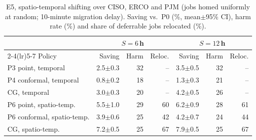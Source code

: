 \begin{table}[t]
\caption{E5, spatio-temporal shifting over CISO, ERCO and PJM (jobs homed uniformly at random; 10-minute
migration delay). Saving vs.\ P0 (\%, mean$\pm$95\% CI), harm rate (\%) and share of deferrable jobs relocated (\%).}
\label{tab:spatial}
\centering\scriptsize\setlength{\tabcolsep}{2.5pt}
\begin{tabular}{lrrrrrr}
\toprule
 & \multicolumn{3}{c}{$S=6$\,h} & \multicolumn{3}{c}{$S=12$\,h} \\
\cmidrule(lr){2-4}\cmidrule(lr){5-7}
Policy & Saving & Harm & Reloc. & Saving & Harm & Reloc. \\
\midrule
P3 point, temporal & 2.5$\pm$0.3 & 32 & -- & 3.5$\pm$0.5 & 32 & -- \\
P4 conformal, temporal & 0.8$\pm$0.2 & 18 & -- & 1.3$\pm$0.3 & 21 & -- \\
CG, temporal & 3.0$\pm$0.3 & 20 & -- & 4.2$\pm$0.5 & 26 & -- \\
P6 point, spatio-temp. & 5.5$\pm$1.0 & 29 & 60 & 6.2$\pm$0.9 & 28 & 61 \\
P6 conformal, spatio-temp. & 3.9$\pm$0.6 & 25 & 42 & 4.2$\pm$0.7 & 24 & 44 \\
CG, spatio-temp. & 7.2$\pm$0.5 & 25 & 67 & 7.9$\pm$0.5 & 25 & 67 \\
\bottomrule
\end{tabular}
\end{table}
